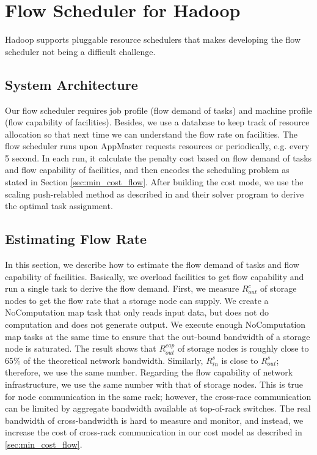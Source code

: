 \section{Flow Scheduler for Hadoop}
\label{sec:flow_scheduler}

Hadoop supports pluggable resource schedulers that makes developing the flow scheduler not being a difficult challenge.
\subsection{System Architecture}
Our flow scheduler requires job profile (flow demand of tasks) and machine profile (flow capability of facilities).
Besides, we use a database to keep track of resource allocation so that next time we can understand the flow rate on facilities.
The flow scheduler runs upon AppMaster requests resources or periodically, e.g. every 5 second.
In each run, it calculate the penalty cost based on flow demand of tasks and flow capability of facilities, and then encodes the scheduling problem as stated in Section \ref{sec:min_cost_flow}.
After building the cost mode, we use the scaling push-relabled method as described in \cite{GoldbergA1997_Scaling} and their solver program to derive the optimal task assignment.

\subsection{Estimating Flow Rate}
In this section, we describe how to estimate the flow demand of tasks and flow capability of facilities.
Basically, we overload facilities to get flow capability and run a single task to derive the flow demand.
First, we measure $R^{c}_{out}$ of storage nodes to get the flow rate that a storage node can supply.
We create a NoComputation map task that only reads input data, but does not do computation and does not generate output.
We execute enough NoComputation map tasks at the same time to ensure that the out-bound bandwidth of a storage node is saturated.
The result shows that $R^{cap}_{out}$ of storage nodes is roughly close to 65\% of the theoretical network bandwidth.
Similarly, $R^{s}_{in}$  is close to $R^{s}_{out}$; therefore, we use the same number.
Regarding the flow capability of network infrastructure, we use the same number with that of storage nodes.
This is true for node communication in the same rack; however, the cross-race communication can be limited by aggregate bandwidth available at top-of-rack switches.
The real bandwidth of cross-bandwidth is hard to measure and monitor, and instead, we increase the cost of cross-rack communication in our cost model as described in \ref{sec:min_cost_flow}.


